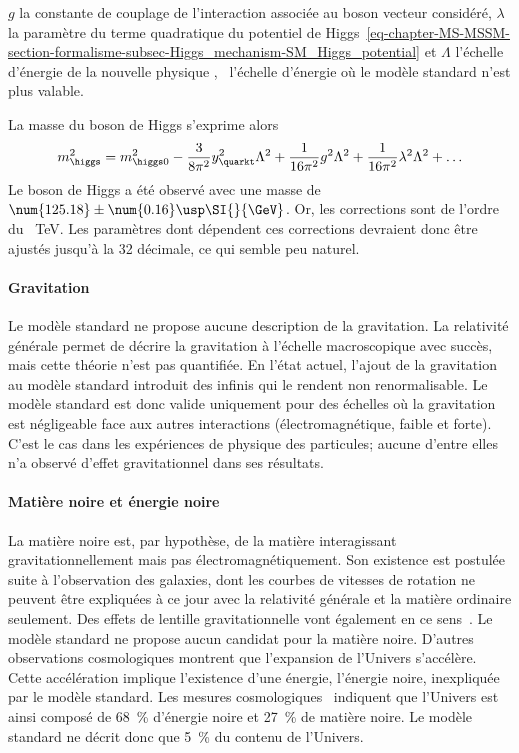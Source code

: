 $g$ la constante de couplage de l'interaction associée au boson vecteur considéré,
$\lambda$ la paramètre du terme quadratique du potentiel de Higgs~\eqref{eq-chapter-MS-MSSM-section-formalisme-subsec-Higgs_mechanism-SM_Higgs_potential} et
$\Lambda$ l'échelle d'énergie de la \og nouvelle physique \fg, \ie\ l'échelle d'énergie où le modèle standard n'est plus valable.
\par La masse du boson de Higgs s'exprime alors
\begin{equation}
m_{\higgs}^2 = m_{\higgs 0}^2 -\frac{3}{8\pi^2} y_{\quarkt}^2 \Lambda^2  +\frac{1}{16\pi^2} g^2 \Lambda^2 + \frac{1}{16\pi^2} \lambda^2 \Lambda^2 + \ldots
\end{equation}
Le boson de Higgs a été observé avec une masse de $\num{125.18}\pm\num{0.16}\usp\SI{}{\GeV}$.
Or, les corrections sont de l'ordre du \SI{}{\TeV}.
Les paramètres dont dépendent ces corrections devraient donc être ajustés jusqu'à la 32 décimale, ce qui semble peu naturel.
\paragraph{Gravitation}
Le modèle standard ne propose aucune description de la gravitation.
La relativité générale permet de décrire la gravitation à l'échelle macroscopique avec succès, mais cette théorie n'est pas quantifiée.
En l'état actuel, l'ajout de la gravitation au modèle standard introduit des infinis qui le rendent non renormalisable.
Le modèle standard est donc valide uniquement pour des échelles où la gravitation est négligeable face aux autres interactions (électromagnétique, faible et forte).
C'est le cas dans les expériences de physique des particules; aucune d'entre elles n'a observé d'effet gravitationnel dans ses résultats.
\paragraph{Matière noire et énergie noire}
La matière noire est, par hypothèse, de la matière interagissant gravitationnellement mais pas électromagnétiquement.
Son existence est postulée suite à l'observation des galaxies, dont les courbes de vitesses de rotation ne peuvent être expliquées à ce jour avec la relativité générale et la matière ordinaire seulement. Des effets de lentille gravitationnelle vont également en ce sens~\cite{Clowe_2006}.
Le modèle standard ne propose aucun candidat pour la matière noire.
D'autres observations cosmologiques montrent que l'expansion de l'Univers s'accélère. Cette accélération implique l'existence d'une énergie, l'énergie noire, inexpliquée par le modèle standard.
Les mesures cosmologiques~\cite{planck_2013} indiquent que l'Univers est ainsi composé de \SI{68}{\%} d'énergie noire et \SI{27}{\%} de matière noire. Le modèle standard ne décrit donc que \SI{5}{\%} du contenu de l'Univers.
